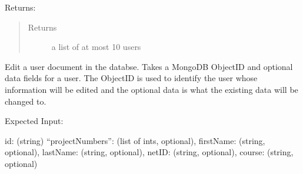 \documentclass[letterpaper,10pt,english]{sphinxmanual}
\begin{document}
\begin{fulllineitems}
\begin{fulllineitems}
Returns:

\begin{sphinxVerbatim}
\end{sphinxVerbatim}
\begin{quote}\begin{description}
\item[{Returns}] \leavevmode
a list of at most 10 users

\end{description}\end{quote}

\end{fulllineitems}


\begin{fulllineitems}
\label{\detokenize{apidoc/utdesign_procurement:utdesign_procurement.apigateway.ApiGateway.userEdit}}
Edit a user document in the databse. Takes a
MongoDB ObjectID and optional data fields for a user. The ObjectID is
used to identify the user whose information will be edited and the
optional data is what the existing data will be changed to.

Expected Input:

\begin{sphinxVerbatim}[commandchars=\\\{\}]
\PYGZob{}
    \PYGZdq{}\PYGZus{}id\PYGZdq{}: (string)
    “projectNumbers”: (list of ints, optional),
    \PYGZdq{}firstName\PYGZdq{}: (string, optional),
    \PYGZdq{}lastName\PYGZdq{}: (string, optional),
    \PYGZdq{}netID\PYGZdq{}: (string, optional),
    \PYGZdq{}course\PYGZdq{}: (string, optional)
\PYGZcb{}
\end{sphinxVerbatim}

\end{fulllineitems}



\end{fulllineitems}
\end{document}
